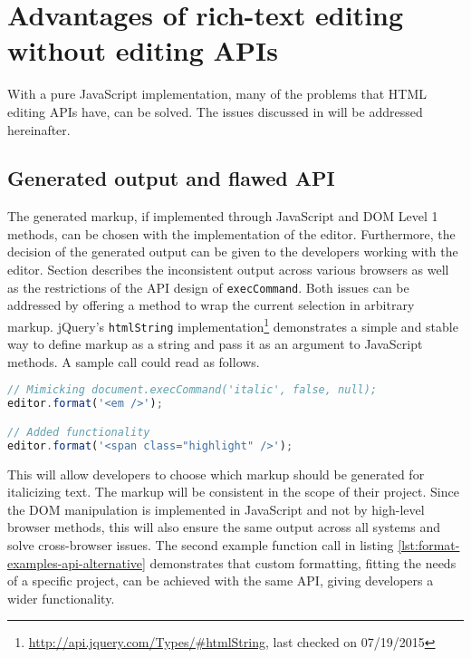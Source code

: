 
\section{Advantages of rich-text editing without editing APIs}

With a pure JavaScript implementation, many of the problems that HTML editing APIs have, can be solved. The issues discussed in  will be addressed hereinafter.

\subsection{Generated output and flawed API} 
\label{subsec:adv_flawed_api}


The generated markup, if implemented through JavaScript and DOM Level 1 methods, can be chosen with the implementation of the editor. Furthermore, the decision of the generated output can be given to the developers working with the editor. Section  describes the inconsistent output across various browsers as well as the restrictions of the API design of \texttt{execCommand}. Both issues can be addressed by offering a method to wrap the current selection in arbitrary markup. jQuery's \texttt{htmlString} implementation\footnote{\url{http://api.jquery.com/Types/\#htmlString}, last checked on 07/19/2015} demonstrates a simple and stable way to define markup as a string and pass it as an argument to JavaScript methods. A sample call could read as follows.

\begin{lstlisting}[language=JavaScript, caption=Example calls to format text, label=lst:format-examples-api-alternative]
// Mimicking document.execCommand('italic', false, null);
editor.format('<em />');

// Added functionality
editor.format('<span class="highlight" />');
\end{lstlisting}

This will allow developers to choose which markup should be generated for italicizing text. The markup will be consistent in the scope of their project. Since the DOM manipulation is implemented in JavaScript and not by high-level browser methods, this will also ensure the same output across all systems and solve cross-browser issues. The second example function call in listing \ref{lst:format-examples-api-alternative} demonstrates that custom formatting, fitting the needs of a specific project, can be achieved with the same API, giving developers a wider functionality.

